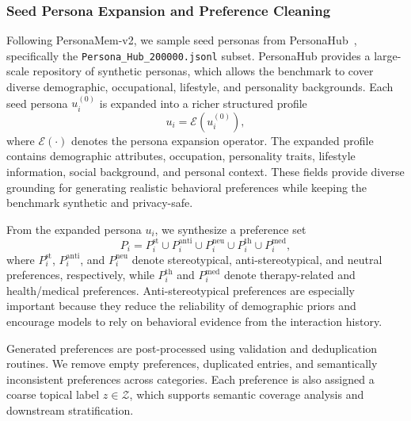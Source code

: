 \documentclass{article}
\begin{document}
\subsubsection{Seed Persona Expansion and Preference Cleaning}
\label{app:persona_seed_preferences}
Following PersonaMem-v2, we sample seed personas from PersonaHub~\cite{ge2024scaling}, specifically the \texttt{Persona\_Hub\_200000.jsonl} subset. PersonaHub provides a large-scale repository of synthetic personas, which allows the benchmark to cover diverse demographic, occupational, lifestyle, and personality backgrounds. Each seed persona $u_i^{(0)}$ is expanded into a richer structured profile
\[
u_i = \mathcal{E}\!\left(u_i^{(0)}\right),
\]
where $\mathcal{E}(\cdot)$ denotes the persona expansion operator. The expanded profile contains demographic attributes, occupation, personality traits, lifestyle information, social background, and personal context. These fields provide diverse grounding for generating realistic behavioral preferences while keeping the benchmark synthetic and privacy-safe.

From the expanded persona $u_i$, we synthesize a preference set
\[
P_i =
P_i^{\mathrm{st}}
\cup
P_i^{\mathrm{anti}}
\cup
P_i^{\mathrm{neu}}
\cup
P_i^{\mathrm{th}}
\cup
P_i^{\mathrm{med}},
\]
where $P_i^{\mathrm{st}}$, $P_i^{\mathrm{anti}}$, and $P_i^{\mathrm{neu}}$ denote stereotypical, anti-stereotypical, and neutral preferences, respectively, while $P_i^{\mathrm{th}}$ and $P_i^{\mathrm{med}}$ denote therapy-related and health/medical preferences. Anti-stereotypical preferences are especially important because they reduce the reliability of demographic priors and encourage models to rely on behavioral evidence from the interaction history.

Generated preferences are post-processed using validation and deduplication routines. We remove empty preferences, duplicated entries, and semantically inconsistent preferences across categories. Each preference is also assigned a coarse topical label $z \in \mathcal{Z}$, which supports semantic coverage analysis and downstream stratification.
\end{document}

